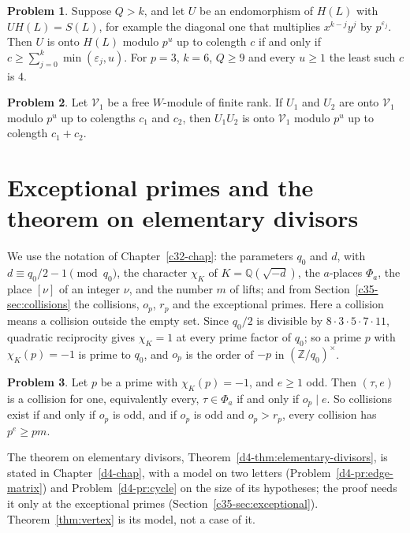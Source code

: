 \documentclass[reqno]{amsart}
\newcounter{chap}
\theoremstyle{definition}
\newtheorem{problem}{Problem}[section]
\theoremstyle{plain}
\newcommand{\Z}{\mathbb{Z}}
\newcommand{\Q}{\mathbb{Q}}
\begin{document}
\begin{problem}\label{pr:onto-vertex}
Suppose \(Q > k\), and let \(U\) be an endomorphism of \(H(L)\) with \(U H(L) = S(L)\), for example the diagonal one that multiplies \(x^{k-j}y^j\) by \(p^{\varepsilon_j}\).  Then \(U\) is onto \(H(L)\) modulo \(p^u\) up to colength \(c\) if and only if \(c \ge \sum_{j=0}^k \min(\varepsilon_j, u)\).  For \(p = 3\), \(k = 6\), \(Q \ge 9\) and every \(u \ge 1\) the least such \(c\) is \(4\).
\end{problem}

\begin{problem}\label{pr:onto-prod}
Let \(\mathcal V_1\) be a free \(W\)-module of finite rank.  If \(U_1\) and \(U_2\) are onto \(\mathcal V_1\) modulo \(p^u\) up to colengths \(c_1\) and \(c_2\), then \(U_1 U_2\) is onto \(\mathcal V_1\) modulo \(p^u\) up to colength \(c_1 + c_2\).
\end{problem}

\section{Exceptional primes and the theorem on elementary divisors}\label{sec:general}

We use the notation of Chapter~\ref{c32-chap}: the parameters \(q_0\) and \(d\), with \(d \equiv q_0/2 - 1 \pmod{q_0}\), the character \(\chi_K\) of \(K = \Q(\sqrt{-d})\), the \(a\)-places \(\Phi_a\), the place \([\nu]\) of an integer \(\nu\), and the number \(m\) of lifts; and from Section~\ref{c35-sec:collisions} the collisions, \(o_p\), \(r_p\) and the exceptional primes.  Here a collision means a collision outside the empty set.  Since \(q_0/2\) is divisible by \(8 \cdot 3 \cdot 5 \cdot 7 \cdot 11\), quadratic reciprocity gives \(\chi_K = 1\) at every prime factor of \(q_0\); so a prime \(p\) with \(\chi_K(p) = -1\) is prime to \(q_0\), and \(o_p\) is the order of \(-p\) in \((\Z/q_0)^\times\).

\begin{problem}\label{pr:collision}
Let \(p\) be a prime with \(\chi_K(p) = -1\), and \(e \ge 1\) odd.  Then \((\tau, e)\) is a collision for one, equivalently every, \(\tau \in \Phi_a\) if and only if \(o_p \mid e\).  So collisions exist if and only if \(o_p\) is odd, and if \(o_p\) is odd and \(o_p > r_p\), every collision has \(p^e \ge pm\).
\end{problem}

The theorem on elementary divisors, Theorem~\ref{d4-thm:elementary-divisors}, is stated in Chapter~\ref{d4-chap}, with a model on two letters (Problem~\ref{d4-pr:edge-matrix}) and Problem~\ref{d4-pr:cycle} on the size of its hypotheses; the proof needs it only at the exceptional primes (Section~\ref{c35-sec:exceptional}).  Theorem~\ref{thm:vertex} is its model, not a case of it.
\end{document}
